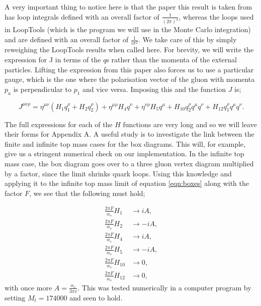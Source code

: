 A very important thing to notice here is that the paper this result is taken from has loop integrals defined with an overall factor of $\frac{1}{(2 \pi)^4}$, whereas the loops used in LoopTools \cite{Hahn1999} (which is the program we will use in the Monte Carlo integration) and \cite{DelDuca2001} are defined with an overall factor of $\frac{1}{i \pi^2}$. We take care of this by simply reweighing the LoopTools results when called here. For brevity, we will write the expression for J in terms of the $q$s rather than the momenta of the external particles. Lifting the expression from this paper also forces us to use a particular gauge, which is the one where the polarisation vector of the gluon with momenta $p_a$ is perpendicular to $p_1$ and vice versa. Imposing this and the function $J$ is;%

\begin{equation}
J^{\mu \nu \rho} = \eta^{\mu \nu}(H_1 q_1^\rho + H_2 q_2^\rho) + \eta^{\mu \rho}H_4 q^\nu + \eta^{\nu \rho}H_5 q^\mu + H_{10} q_2^\rho q^\mu q^\nu + H_{12} q_1^\rho q^\mu q^\nu.
\label{eqn:boxes}
\end{equation}

The full expressions for each of the $H$ functions are very long and so we will leave their forms for Appendix A. A useful study is to investigate the link between the finite and infinite top mass cases for the box diagrams. This will, for example, give us a stringent numerical check on our implementation. In the infinite top mass case, the box diagram goes over to a three gluon vertex diagram multiplied by a factor, since the limit shrinks quark loops. Using this knowledge and applying it to the infinite top mass limit of equation \ref{eqn:boxes} along with the factor $F$, we see that the following must hold; 

\begin{equation}
\begin{split}
\frac{2 \pi F}{\alpha_s} H_1 & \to i A, \\
\frac{2 \pi F}{\alpha_s} H_2  &\to -i A, \\
\frac{2 \pi F}{\alpha_s} H_4  &\to i A, \\
\frac{2 \pi F}{\alpha_s} H_5  &\to -i A, \\
\frac{2 \pi F}{\alpha_s} H_{10} &\to 0, \\
\frac{2 \pi F}{\alpha_s} H_{12} &\to 0,
\end{split}
\end{equation}
with once more $A = \frac{\alpha_s}{3 \pi v}$. This was tested numerically in a computer program by setting $M_t = 174000$ and seen to hold. %

